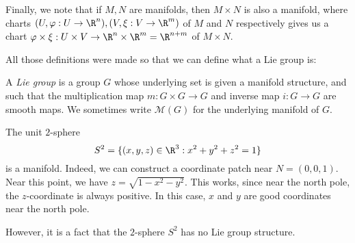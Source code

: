 \documentclass[a4paper]{article}
\begin{document}
\begin{defi}
\begin{center}
  \end{center}
\end{defi}

Finally, we note that if $M, N$ are manifolds, then $M \times N$ is also a manifold, where charts $(U, \varphi: U \to \R^n), (V, \xi: V \to \R^m)$ of $M$ and $N$ respectively gives us a chart $\varphi \times \xi: U \times V \to \R^n \times \R^m = \R^{n + m}$ of $M \times N$.

All those definitions were made so that we can define what a Lie group is:

\begin{defi}
  A \emph{Lie group} is a group $G$ whose underlying set is given a manifold structure, and such that the multiplication map $m: G \times G \to G$ and inverse map $i: G \to G$ are smooth maps. We sometimes write $\mathcal{M}(G)$ for the underlying manifold of $G$.
\end{defi}

\begin{eg}
  The unit $2$-sphere
  \[
    S^2 = \{(x, y, z) \in \R^3: x^2 + y^2 + z^2 = 1\}
  \]
  is a manifold. Indeed, we can construct a coordinate patch near $N = (0, 0, 1)$. Near this point, we have $z = \sqrt{1 - x^2 - y^2}$. This works, since near the north pole, the $z$-coordinate is always positive. In this case, $x$ and $y$ are good coordinates near the north pole.

  However, it is a fact that the $2$-sphere $S^2$ has no Lie group structure.
\end{eg}
\end{document}
